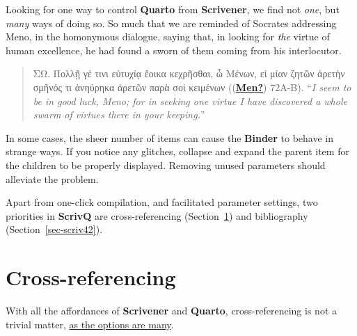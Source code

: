\documentclass[
  12pt,
  a4paper,
  oneside,
  titlepage,
  toclink=all,
  toc=bibliography]{scrbook}
\theoremstyle{definition}
\theoremstyle{plain}
\theoremstyle{plain}
\theoremstyle{plain}
\theoremstyle{plain}
\theoremstyle{definition}
\theoremstyle{definition}
\theoremstyle{plain}
\theoremstyle{remark}
\begin{document}
Looking for one way to control \textbf{Quarto} from \textbf{Scrivener},
we find not \emph{one}, but \emph{many} ways of doing so. So much that
we are reminded of Socrates addressing Meno, in the homonymous dialogue,
saying that, in looking for \emph{the} virtue of human excellence, he
had found a sworn of them coming from his interlocutor.

\begin{quote}
ΣΩ. Πολλῇ γέ τινι εὐτυχίᾳ ἔοικα κεχρῆσθαι, ὦ Μένων, εἰ μίαν ζητῶν ἀρετὴν
σμῆνός τι ἀνηύρηκα ἀρετῶν παρὰ σοὶ κειμένων
(\protect\hypertarget{cite_3}{}{\label{cite_3}(\protect\hyperlink{ref-Men}{\textbf{Men?}})}
72A-B). \enquote{\emph{I seem to be in good luck, Meno; for in seeking
one virtue I have discovered a whole swarm of virtues there in your
keeping.}}
\end{quote}

\begin{tcolorbox}[enhanced jigsaw, left=2mm, colframe=quarto-callout-caution-color-frame, bottomtitle=1mm, colback=white, coltitle=black, title=\textcolor{quarto-callout-caution-color}{\faFire}\hspace{0.5em}{Binder glitches}, toprule=.15mm, rightrule=.15mm, opacityback=0, breakable, toptitle=1mm, titlerule=0mm, colbacktitle=quarto-callout-caution-color!10!white, arc=.35mm, bottomrule=.15mm, leftrule=.75mm, opacitybacktitle=0.6]

In some cases, the sheer number of items can cause the \textbf{Binder}
to behave in strange ways. If you notice any glitches, collapse and
expand the parent item for the children to be properly displayed.
Removing unused parameters should alleviate the problem.

\end{tcolorbox}

Apart from one-click compilation, and facilitated parameter settings,
two priorities in \textbf{ScrivQ} are cross-referencing
(\protect\hypertarget{cite_4}{}{\label{cite_4}Section~\ref{sec-scriv3}})
and bibliography
(\protect\hypertarget{cite_5}{}{\label{cite_5}Section~\ref{sec-scriv42}}).

\hypertarget{sec-scriv3}{%
\chapter{Cross-referencing}\label{sec-scriv3}}

\protect\hypertarget{scriv3}{}{}

With all the affordances of \textbf{Scrivener} and \textbf{Quarto},
cross-referencing is not a trivial matter, \ul{as the options are many}.
\end{document}
